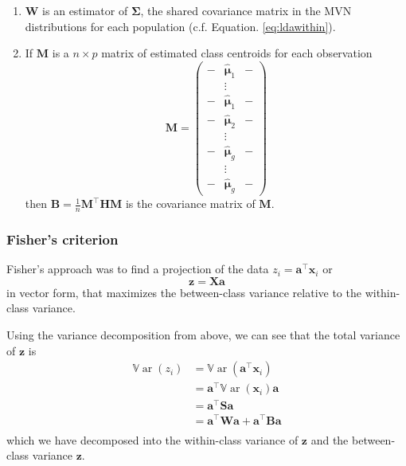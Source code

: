 \documentclass[
]{book}
\theoremstyle{definition}
\theoremstyle{definition}
\theoremstyle{definition}
\theoremstyle{definition}
\theoremstyle{remark}
\begin{document}
\begin{enumerate}
\def\labelenumi{\arabic{enumi}.}
\item
  \(\mathbf W\) is an estimator of \(\boldsymbol{\Sigma}\), the shared covariance matrix in the MVN distributions for each population (c.f. Equation.
  \eqref{eq:ldawithin}).
\item
  If \(\mathbf M\) is a \(n \times p\) matrix of estimated class centroids for each observation
  \[\mathbf M= \begin{pmatrix} -& \hat{{\boldsymbol{\mu}}}_1 &-\\
  &\vdots &\\
  -& \hat{{\boldsymbol{\mu}}}_1 &-\\
  -& \hat{{\boldsymbol{\mu}}}_2 &-\\
  &\vdots&\\
  -& \hat{{\boldsymbol{\mu}}}_g &-\\
  &\vdots &\\
  -& \hat{{\boldsymbol{\mu}}}_g &-\end{pmatrix}\]
  then \(\mathbf B=\frac{1}{n}\mathbf M^\top\mathbf H\mathbf M\) is the covariance matrix of \(\mathbf M\).
\end{enumerate}

\subsubsection*{Fisher's criterion}\label{fishers-criterion}

Fisher's approach was to find a projection of the data \(z_i = \mathbf a^\top \mathbf x_i\) or
\[\mathbf z= \mathbf X\mathbf a\]
in vector form,
that maximizes the between-class variance relative to the within-class variance.

Using the variance decomposition from above, we can see that the total variance of \(\mathbf z\) is
\begin{align*}
{\mathbb{V}\operatorname{ar}}(z_i)&= {\mathbb{V}\operatorname{ar}}(\mathbf a^\top \mathbf x_i)\\
&=\mathbf a^\top {\mathbb{V}\operatorname{ar}}(\mathbf x_i) \mathbf a\\
&=\mathbf a^\top \mathbf S\mathbf a\\
&= \mathbf a^\top\mathbf W\mathbf a+ \mathbf a^\top\mathbf B\mathbf a\\
\end{align*}
which we have decomposed into the within-class variance of \(\mathbf z\) and the between-class variance \(\mathbf z\).
\end{document}
